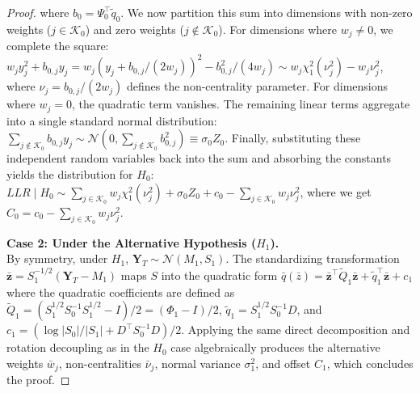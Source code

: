 \documentclass[letterpaper, 10 pt, conference]{ieeeconf}  %
\begin{document}
\begin{proof}
where $b_0 = \Psi_0^\top \tilde{q}_0$. We now partition this sum into dimensions with non-zero weights ($j \in \mathcal{K}_0$) and zero weights ($j \notin \mathcal{K}_0$). For dimensions where $w_j \neq 0$, we complete the square: $w_j y_j^2 + b_{0,j} y_j = w_j ( y_j + b_{0,j}/(2w_j) )^2 - b_{0,j}^2/(4w_j) \sim w_j \chi^2_1(\nu_j^2) - w_j \nu_j^2$, where $\nu_j = b_{0,j}/(2w_j)$ defines the non-centrality parameter. For dimensions where $w_j = 0$, the quadratic term vanishes. The remaining linear terms aggregate into a single standard normal distribution: $\sum_{j \notin \mathcal{K}_0} b_{0,j} y_j \sim \mathcal{N}(0, \sum_{j \notin \mathcal{K}_0} b_{0,j}^2) \equiv \sigma_0 Z_0$. Finally, substituting these independent random variables back into the sum and absorbing the constants yields the distribution for $H_0$: $LLR \mid H_0 \sim \sum_{j \in \mathcal{K}_0} w_j \chi^2_1(\nu_j^2) + \sigma_0 Z_0 + c_{0} - \sum_{j \in \mathcal{K}_0} w_j \nu_j^2$, where we get $C_0 = c_{0} - \sum_{j \in \mathcal{K}_0} w_j \nu_j^2$.

\vspace{1ex}
\noindent \textbf{Case 2: Under the Alternative Hypothesis ($H_1$).} \\
By symmetry, under $H_1$, $\mathbf{Y}_T \sim \mathcal{N}(M_1, S_1)$. The standardizing transformation $\bar{\mathbf{z}} = S_1^{-1/2}(\mathbf{Y}_T - M_1)$ maps $S$ into the quadratic form $\bar{q}(\bar{z}) = \bar{\mathbf{z}}^\top \tilde{Q}_1 \bar{\mathbf{z}} + \tilde{q}_1^\top \bar{\mathbf{z}} + c_{1}$ where the quadratic coefficients are defined as $\tilde{Q}_1 = (S_1^{1/2} S_0^{-1} S_1^{1/2} - I)/2 = (\Phi_1 - I)/2$, $\tilde{q}_1 = S_1^{1/2} S_0^{-1} D$, and $c_{1} = ( \log |S_0|/|S_1| + D^\top S_0^{-1} D )/2$. Applying the same direct decomposition and rotation decoupling as in the $H_0$ case algebraically produces the alternative weights $\bar{w}_j$, non-centralities $\bar{\nu}_j$, normal variance $\sigma_1^2$, and offset $C_1$, which concludes the proof.
\end{proof}
\end{document}
